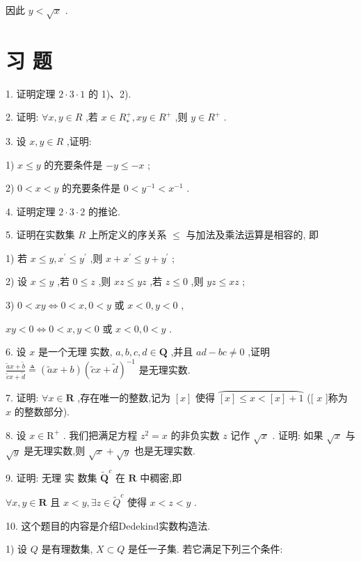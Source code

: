 因此 $y < \sqrt{x}$ .

\section*{习 题}

1. 证明定理 $2 \cdot  3 \cdot  1$ 的 1)、2).

2. 证明: $\forall x,y \in  R$ ,若 $x \in  {R}_{ * }^{ + },{xy} \in  {R}^{ + }$ ,则 $y \in  {R}^{ + }$ .

3. 设 $x,y \in  R$ ,证明:

1) $x \leq  y$ 的充要条件是 $- y \leq   - x$ ;

2) $0 < x < y$ 的充要条件是 $0 < {y}^{-1} < {x}^{-1}$ .

4. 证明定理 $2 \cdot  3 \cdot  2$ 的推论.

5. 证明在实数集 $R$ 上所定义的序关系 $\leq$ 与加法及乘法运算是相容的, 即

1) 若 $x \leq  y,{x}^{\prime } \leq  {y}^{\prime }$ ,则 $x + {x}^{\prime } \leq  y + {y}^{\prime }$ ;

2) 设 $x \leq  y$ ,若 $0 \leq  z$ ,则 ${xz} \leq  {yz}$ ,若 $z \leq  0$ ,则 ${yz} \leq  {xz}$ ;

3) $0 < {xy} \Leftrightarrow  0 < x,0 < y$ 或 $x < 0,y < 0$ ,

${xy} < 0 \Leftrightarrow  0 < x,y < 0$ 或 $x < 0,0 < y$ .

6. 设 $x$ 是一个无理 实数, $a,b,c,d \in  \mathbf{Q}$ ,并且 ${ad} - {bc} \neq  0$ ,证明 $\frac{\widetilde{a}x + \widetilde{b}}{\widetilde{c}x + \widetilde{d}} \triangleq  \left( {\widetilde{a}x + b}\right) {\left( \widetilde{c}x + \widetilde{d}\right) }^{-1}$ 是无理实数.

7. 证明: $\forall x \in  \mathbf{R}$ ,存在唯一的整数,记为 $\left\lbrack  x\right\rbrack$ 使得 $\overset{⏜}{\left\lbrack  x\right\rbrack   \leq  x < \left\lbrack  x\right\rbrack   + 1}$ ([ $x$ ]称为 $x$ 的整数部分).

8. 设 $x \in  {\mathrm{R}}^{ + }$ . 我们把满足方程 ${z}^{2} = x$ 的非负实数 $z$ 记作 $\sqrt{x}$ . 证明: 如果 $\sqrt{x}$ 与 $\sqrt{y}$ 是无理实数,则 $\sqrt{x} + \sqrt{y}$ 也是无理实数.

9. 证明: 无理 实 数集 ${\widetilde{\mathbf{Q}}}^{c}$ 在 $\mathbf{R}$ 中稠密,即

$\forall x,y \in  \mathbf{R}$ 且 $x < y,\exists z \in  {\widetilde{Q}}^{c}$ 使得 $x < z < y$ .

10. 这个题目的内容是介绍Dedekind实数构造法.

1) 设 $Q$ 是有理数集, $X \subset  Q$ 是任一子集. 若它满足下列三个条件:

